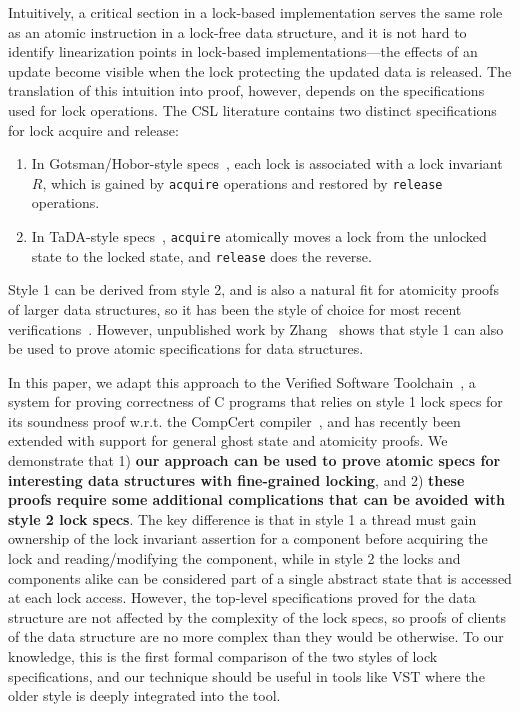 Intuitively, a critical section in a lock-based implementation serves the same role as an atomic instruction in a lock-free data structure, and it is not hard to identify linearization points in lock-based implementations---the effects of an update become visible when the lock protecting the updated data is released. The translation of this intuition into proof, however, depends on the specifications used for lock operations. The CSL literature contains two distinct specifications for lock acquire and release:
\begin{enumerate}
\item In Gotsman/Hobor-style specs~\cite{gotsman,oraclesematic}, each lock is associated with a lock invariant $R$, which is gained by \texttt{acquire} operations and restored by \texttt{release} operations.
\item In TaDA-style specs~\cite{tada}, \texttt{acquire} atomically moves a lock from the unlocked state to the locked state, and \texttt{release} does the reverse.
\end{enumerate}
Style 1 can be derived from style 2, and is also a natural fit for atomicity proofs of larger data structures, so it has been the style of choice for most recent verifications~\cite{tada-live,templates}. However, unpublished work by Zhang~\cite{atomic-syncer} shows that style 1 can also be used to prove atomic specifications for data structures.

In this paper, we adapt this  approach to the Verified Software Toolchain~\cite{plfcc}, a system for proving correctness of C programs that relies on style 1 lock specs for its soundness proof w.r.t. the CompCert compiler~\cite{compcert}, and has recently been extended with support for general ghost state and atomicity proofs. We demonstrate that 1) \textbf{our approach can be used to prove atomic specs for interesting data structures with fine-grained locking}, and 2) \textbf{these proofs require some additional complications that can be avoided with style 2 lock specs}. The key difference is that in style 1 a thread must gain ownership of the lock invariant assertion for a component before acquiring the lock and reading/modifying the component, while in style 2 the locks and components alike can be considered part of a single abstract state that is accessed at each lock access. However, the top-level specifications proved for the data structure are not affected by the complexity of the lock specs, so proofs of clients of the data structure are no more complex than they would be otherwise. To our knowledge, this is the first formal comparison of the two styles of lock specifications, and our technique should be useful in tools like VST where the older style is deeply integrated into the tool.

